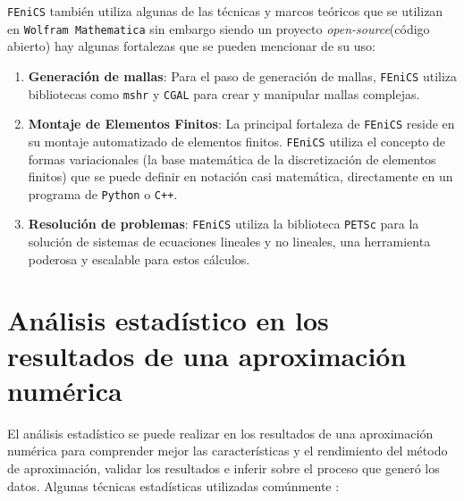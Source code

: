 \documentclass[a4paper]{article}
\begin{document}
\texttt{FEniCS} también utiliza algunas de las técnicas y marcos teóricos que se utilizan en \texttt{Wolfram Mathematica} sin embargo siendo un proyecto \textit{open-source}(código abierto) hay algunas fortalezas que se pueden mencionar de su uso:
\begin{enumerate}
  \item \textbf{Generación de mallas}: Para el paso de generación de mallas, \texttt{FEniCS} utiliza bibliotecas como \texttt{mshr} y \texttt{CGAL} para crear y manipular mallas complejas.
  \item \textbf{Montaje de Elementos Finitos}: La principal fortaleza de \texttt{FEniCS} reside en su montaje automatizado de elementos finitos. \texttt{FEniCS} utiliza el concepto de formas variacionales (la base matemática de la discretización de elementos finitos) que se puede definir en notación casi matemática, directamente en un programa de \texttt{Python} o \texttt{C++}.
  \item \textbf{Resolución de problemas}: \texttt{FEniCS} utiliza la biblioteca \texttt{PETSc} para la solución de sistemas de ecuaciones lineales y no lineales, una herramienta poderosa y escalable para estos cálculos.
\end{enumerate}

\section{Análisis estadístico en los resultados de una aproximación numérica}

El análisis estadístico se puede realizar en los resultados de una aproximación numérica para comprender mejor las características y el rendimiento del método de aproximación, validar los resultados e inferir sobre el proceso que generó los datos. Algunas técnicas estadísticas utilizadas comúnmente :
\end{document}
